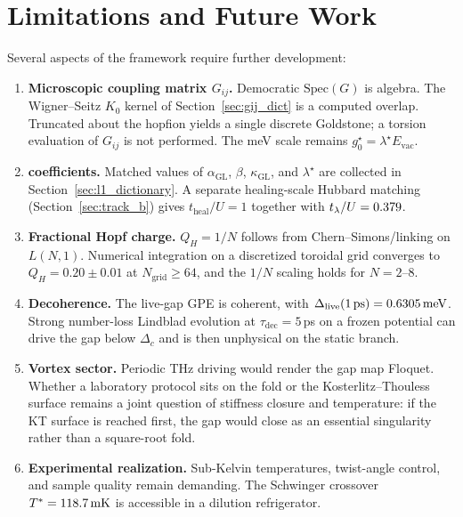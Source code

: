 \documentclass[11pt,letterpaper]{article}
\begin{document}

\section{Limitations and Future Work}

Several aspects of the \QVC{} framework require further development:

\begin{enumerate}
    \item \textbf{Microscopic coupling matrix $G_{ij}$.} Democratic $\mathrm{Spec}(G)$ is algebra. The Wigner--Seitz $K_0$ kernel of Section~\ref{sec:gij_dict} is a computed overlap. Truncated \TQGL{} about the hopfion yields a single discrete Goldstone; a torsion evaluation of $G_{ij}$ is not performed. The meV scale remains $g_0^\star=\lambda^\star E_{\mathrm{vac}}$.
    \item \textbf{\TQGL{} coefficients.} Matched values of $\alpha_{\mathrm{GL}}$, $\beta$, $\kappa_{\mathrm{GL}}$, and $\lambda^\star$ are collected in Section~\ref{sec:l1_dictionary}. A separate healing-scale Hubbard matching (Section~\ref{sec:track_b}) gives $t_{\mathrm{heal}}/U=1$ together with $t_\lambda/U=0.379$.
    \item \textbf{Fractional Hopf charge.} $Q_H = 1/N$ follows from Chern--Simons/linking on $L(N,1)$. Numerical integration on a discretized toroidal grid converges to $Q_H = 0.20 \pm 0.01$ at $N_{\mathrm{grid}} \geq 64$, and the $1/N$ scaling holds for $N = 2$--$8$.
    \item \textbf{Decoherence.} The live-gap GPE is coherent, with $\Delta_{\mathrm{live}}(1\,\mathrm{ps})=0.6305\,\mathrm{meV}$. Strong number-loss Lindblad evolution at $\tau_{\mathrm{dec}}=5$\,ps on a frozen potential can drive the gap below $\Delta_c$ and is then unphysical on the static branch.
    \item \textbf{Vortex sector.} Periodic THz driving would render the gap map Floquet. Whether a laboratory protocol sits on the fold or the Kosterlitz--Thouless surface remains a joint question of stiffness closure and temperature: if the KT surface is reached first, the gap would close as an essential singularity rather than a square-root fold.
    \item \textbf{Experimental realization.} Sub-Kelvin temperatures, twist-angle control, and sample quality remain demanding. The Schwinger crossover $T^*=118.7\,\mathrm{mK}$ is accessible in a dilution refrigerator.
\end{enumerate}
\end{document}
